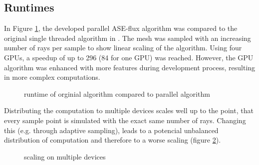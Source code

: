 \subsection{Runtimes}
In Figure \ref{plot:runtime}, the developed parallel ASE-flux algorithm was compared to 
the original single threaded algorithm in
\cite{ASE2010}. The mesh was sampled with an increasing number of rays per sample
to show linear scaling of the algorithm. Using four GPUs, a speedup of up to 
296 (84 for one GPU) was reached. However, the GPU algorithm was enhanced with
more features during development process, resulting in more complex computations.
\begin{figure}[H]
  \centerline{
    }
  \caption{runtime of orginial algorithm compared to parallel algorithm}
  \label{plot:runtime}
\end{figure}
Distributing the computation to multiple devices scales well up to the
point, that every sample point is simulated with the exact same number
of rays. Changing this (e.g. through adaptive sampling), leads to
a potencial unbalanced distribution of computation and therefore to
a worse scaling (figure \ref{plot:gpu_scaling}).
\begin{figure}[H]
  \centerline{
    }
  \caption{scaling on multiple devices}
  \label{plot:gpu_scaling}
\end{figure}
